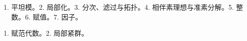 


\begin{enumerate}
\def\labelenumi{\arabic{enumi}.}
\tightlist
\item
  平坦模。2. 局部化。3. 分次、滤过与拓扑。4. 相伴素理想与准素分解。5. 整数。6. 赋值。7. 因子。
\end{enumerate}


\begin{enumerate}
\def\labelenumi{\arabic{enumi}.}
\tightlist
\item
  赋范代数。2. 局部紧群。
\end{enumerate}

